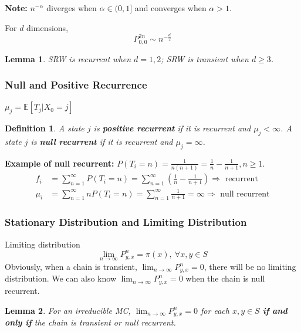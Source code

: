 \documentclass[11pt,a4paper]{article}
\newtheorem{definition}{Definition}
\newtheorem{lemma}{Lemma}
\begin{document}
\textbf{Note:} $n^{-\alpha}$ diverges when $\alpha\in (0,1]$ and converges when $\alpha>1$.

For $d$ dimensions, $$P_{0,0}^{2n}\sim n^{-\frac{d}{2}}$$

\begin{lemma}
    SRW is recurrent when $d=1,2$; SRW is transient when $d\geq 3$.
\end{lemma}



\subsubsection{Null and Positive Recurrence}
$\mu_j= \mathbb{E}[T_j|X_0=j]$
\begin{definition}
    A state $j$ is \textbf{positive recurrent} if it is recurrent and $\mu_j<\infty$. A state $j$ is \textbf{null recurrent} if it is recurrent and $\mu_j=\infty$.
\end{definition}
\textbf{Example of null recurrent:} $P(T_i=n)=\frac{1}{n(n+1)}=\frac{1}{n}-\frac{1}{n+1},n\geq 1$.
\begin{equation}
    \begin{aligned}
        f_i&=\sum_{n=1}^\infty P(T_i=n)=\sum_{n=1}^\infty\left(\frac{1}{n}-\frac{1}{n+1}\right)\Rightarrow \text{ recurrent}\\
        \mu_i&=\sum_{n=1}^\infty nP(T_i=n)=\sum_{n=1}^\infty\frac{1}{n+1}=\infty\Rightarrow \text{ null recurrent}
    \end{aligned}
    \nonumber
\end{equation}

\subsubsection{Stationary Distribution and Limiting Distribution}
Limiting distribution $$\lim_{n \rightarrow \infty}P^{n}_{y,x}=\pi(x),\ \forall x,y\in S$$
Obviously, when a chain is transient, $\lim_{n \rightarrow \infty}P^{n}_{y,x}=0$, there will be no limiting distribution. We can also know $\lim_{n \rightarrow \infty}P^{n}_{y,x}=0$ when the chain is null recurrent.

\begin{lemma}
    For an irreducible MC, $\lim_{n \rightarrow \infty}P^{n}_{y,x}=0$ for each $x,y\in S$ \textbf{if and only if} the chain is transient or null recurrent.
\end{lemma}
\end{document}
